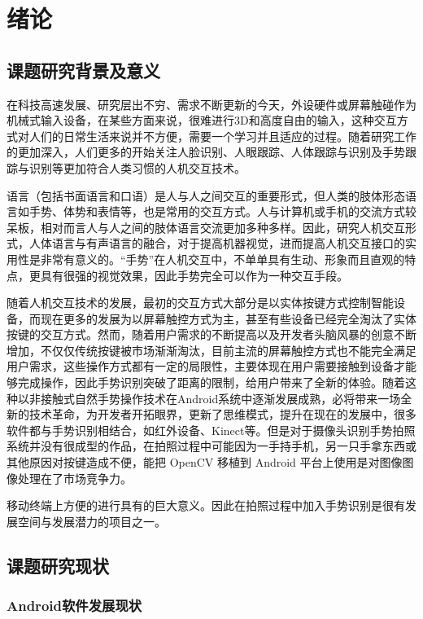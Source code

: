 \documentclass{XDBAthesis}
\begin{document}
\else
\fi
\chapter{绪论}
\section{课题研究背景及意义}

在科技高速发展、研究层出不穷、需求不断更新的今天，外设硬件或屏幕触碰作为机械式输入设备，在某些方面来说，很难进行3D和高度自由的输入，这种交互方式对人们的日常生活来说并不方便，需要一个学习并且适应的过程。随着研究工作的更加深入，人们更多的开始关注人脸识别、人眼跟踪、人体跟踪与识别及手势跟踪与识别等更加符合人类习惯的人机交互技术。

语言（包括书面语言和口语）是人与人之间交互的重要形式，但人类的肢体形态语言如手势、体势和表情等，也是常用的交互方式。人与计算机或手机的交流方式较呆板，相对而言人与人之间的肢体语言交流更加多种多样。因此，研究人机交互形式，人体语言与有声语言的融合，对于提高机器视觉，进而提高人机交互接口的实用性是非常有意义的。“手势”在人机交互中，不单单具有生动、形象而且直观的特点，更具有很强的视觉效果，因此手势完全可以作为一种交互手段。

随着人机交互技术的发展，最初的交互方式大部分是以实体按键方式控制智能设备，而现在更多的发展为以屏幕触控方式为主，甚至有些设备已经完全淘汰了实体按键的交互方式。然而，随着用户需求的不断提高以及开发者头脑风暴的创意不断增加，不仅仅传统按键被市场渐渐淘汰，目前主流的屏幕触控方式也不能完全满足用户需求，这些操作方式都有一定的局限性，主要体现在用户需要接触到设备才能够完成操作，因此手势识别突破了距离的限制，给用户带来了全新的体验。随着这种以非接触式自然手势操作技术在Android系统中逐渐发展成熟，必将带来一场全新的技术革命，为开发者开拓眼界，更新了思维模式，提升在现在的发展中，很多软件都与手势识别相结合，如红外设备、Kinect等。但是对于摄像头识别手势拍照系统并没有很成型的作品，在拍照过程中可能因为一手持手机，另一只手拿东西或其他原因对按键造成不便，能把 OpenCV 移植到 Android 平台上使用是对图像图像处理在了市场竞争力。

移动终端上方便的进行具有的巨大意义。因此在拍照过程中加入手势识别是很有发展空间与发展潜力的项目之一。

\section{课题研究现状}

\subsection{Android软件发展现状}
\end{document}

